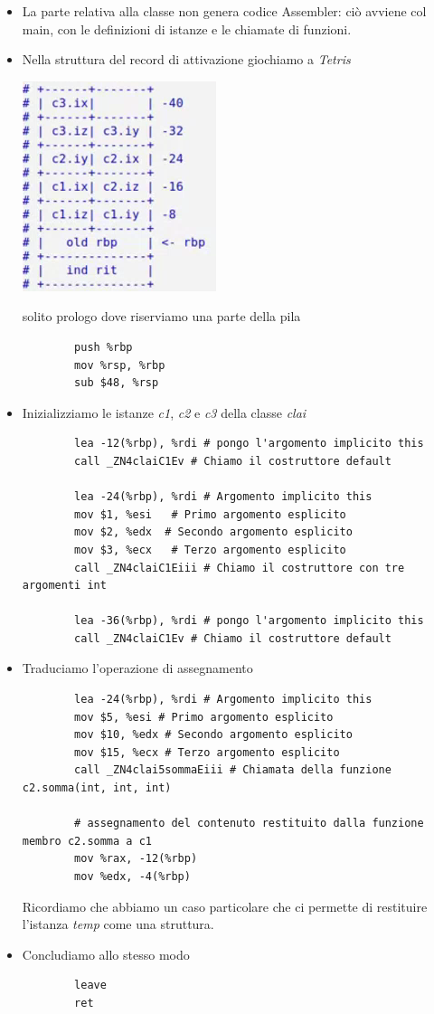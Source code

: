 \begin{itemize}
	\item La parte relativa alla classe non genera codice Assembler: ciò avviene col main, con le definizioni di istanze e le chiamate di funzioni.
	\item Nella struttura del record di attivazione giochiamo a \emph{Tetris}
	\begin{center}
		\includegraphics[scale=.9]{img/42.PNG}
	\end{center}  
	solito prologo dove riserviamo una parte della pila
	\begin{verbatim}
		push %rbp
		mov %rsp, %rbp
		sub $48, %rsp
	\end{verbatim}
	\item Inizializziamo le istanze \emph{c1}, \emph{c2} e \emph{c3} della classe \emph{clai}
	\begin{verbatim}
		lea -12(%rbp), %rdi # pongo l'argomento implicito this
		call _ZN4claiC1Ev # Chiamo il costruttore default
		
		lea -24(%rbp), %rdi # Argomento implicito this
		mov $1, %esi   # Primo argomento esplicito
		mov $2, %edx  # Secondo argomento esplicito
		mov $3, %ecx   # Terzo argomento esplicito
		call _ZN4claiC1Eiii # Chiamo il costruttore con tre argomenti int
		
		lea -36(%rbp), %rdi # pongo l'argomento implicito this
		call _ZN4claiC1Ev # Chiamo il costruttore default
	\end{verbatim}
	\item Traduciamo l'operazione di assegnamento
	\begin{verbatim}
		lea -24(%rbp), %rdi # Argomento implicito this
		mov $5, %esi # Primo argomento esplicito
		mov $10, %edx # Secondo argomento esplicito
		mov $15, %ecx # Terzo argomento esplicito
		call _ZN4clai5sommaEiii # Chiamata della funzione c2.somma(int, int, int)
		
		# assegnamento del contenuto restituito dalla funzione membro c2.somma a c1
		mov %rax, -12(%rbp) 
		mov %edx, -4(%rbp)
	\end{verbatim}
	Ricordiamo che abbiamo un caso particolare che ci permette di restituire l'istanza \emph{temp} come una struttura.
	\item Concludiamo allo stesso modo
	\begin{verbatim}
		leave
		ret
	\end{verbatim}
\end{itemize}
\endgroup